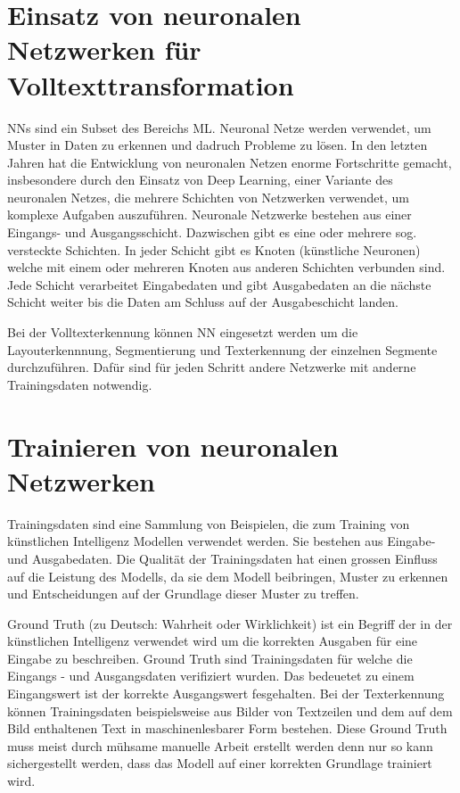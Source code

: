 \documentclass[a4paper,oneside, 12pt]{report}
\begin{document}
\section{Einsatz von neuronalen Netzwerken für Volltexttransformation}
\acp{NN} sind ein Subset des Bereichs \ac{ML}. Neuronal Netze werden verwendet, um Muster in Daten zu erkennen und dadruch Probleme zu lösen. In den letzten Jahren hat die Entwicklung von neuronalen Netzen enorme Fortschritte gemacht, insbesondere durch den Einsatz von Deep Learning, einer Variante des neuronalen Netzes, die mehrere Schichten von Netzwerken verwendet, um komplexe Aufgaben auszuführen. Neuronale Netzwerke bestehen aus einer Eingangs- und Ausgangsschicht. Dazwischen gibt es eine oder mehrere sog. versteckte Schichten. In jeder Schicht gibt es Knoten (künstliche Neuronen) welche mit einem oder mehreren Knoten aus anderen Schichten verbunden sind. Jede Schicht verarbeitet Eingabedaten und gibt Ausgabedaten an die nächste Schicht weiter bis die Daten am Schluss auf der Ausgabeschicht landen. \cite{ibmnn}

Bei der Volltexterkennung können \ac{NN} eingesetzt werden um die Layouterkennnung, Segmentierung und Texterkennung der einzelnen Segmente durchzuführen. Dafür sind für jeden Schritt andere Netzwerke mit anderne Trainingsdaten notwendig.


\section{Trainieren von neuronalen Netzwerken} 
Trainingsdaten sind eine Sammlung von Beispielen, die zum Training von künstlichen Intelligenz Modellen verwendet werden. Sie bestehen aus Eingabe- und Ausgabedaten. Die Qualität der Trainingsdaten hat einen grossen Einfluss auf die Leistung des Modells, da sie dem Modell beibringen, Muster zu erkennen und Entscheidungen auf der Grundlage dieser Muster zu treffen.

Ground Truth (zu Deutsch: Wahrheit oder Wirklichkeit) ist ein Begriff der in der künstlichen Intelligenz verwendet wird um die korrekten Ausgaben für eine Eingabe zu beschreiben. Ground Truth sind Trainingsdaten für welche die Eingangs - und Ausgangsdaten verifiziert wurden. Das bedeuetet zu einem Eingangswert ist der korrekte Ausgangswert fesgehalten. Bei der Texterkennung können Trainingsdaten beispielsweise aus Bilder von Textzeilen und dem auf dem Bild enthaltenen Text in maschinenlesbarer Form bestehen. Diese Ground Truth muss meist durch mühsame manuelle Arbeit erstellt werden denn nur so kann sichergestellt werden, dass das Modell auf einer korrekten Grundlage trainiert wird.
\end{document}
